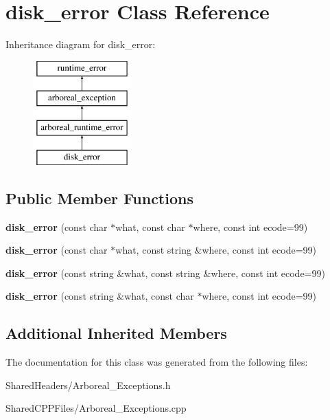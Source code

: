 \hypertarget{classdisk__error}{}\section{disk\+\_\+error Class Reference}
\label{classdisk__error}
Inheritance diagram for disk\+\_\+error\+:\begin{figure}[H]
\begin{center}
\leavevmode
\includegraphics[height=4.000000cm]{classdisk__error}
\end{center}
\end{figure}
\subsection*{Public Member Functions}
\begin{DoxyCompactItemize}
\item 
\mbox{\label{classdisk__error_a2b3f22e37f13642df676c5eaf10526d3}} 
{\bfseries disk\+\_\+error} (const char $\ast$what, const char $\ast$where, const int ecode=99)
\item 
\mbox{\label{classdisk__error_a0c883fc590a36b64bfb88b403637a89f}} 
{\bfseries disk\+\_\+error} (const char $\ast$what, const string \&where, const int ecode=99)
\item 
\mbox{\label{classdisk__error_af7db4123b6989178ad42e577a94b053e}} 
{\bfseries disk\+\_\+error} (const string \&what, const string \&where, const int ecode=99)
\item 
\mbox{\label{classdisk__error_a0288a245365c28dc6c48e5fd0c8fafd7}} 
{\bfseries disk\+\_\+error} (const string \&what, const char $\ast$where, const int ecode=99)
\end{DoxyCompactItemize}
\subsection*{Additional Inherited Members}


The documentation for this class was generated from the following files\+:\begin{DoxyCompactItemize}
\item 
Shared\+Headers/Arboreal\+\_\+\+Exceptions.\+h\item 
Shared\+C\+P\+P\+Files/Arboreal\+\_\+\+Exceptions.\+cpp\end{DoxyCompactItemize}
